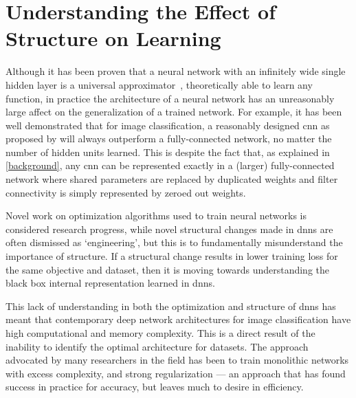 \documentclass[thesis]{subfiles}
\begin{document}
\section[Understanding the Effect of Structure on Learning]{Understanding the Effect of\texorpdfstring{\\}{ }Structure on Learning}
Although it has been proven that a neural network with an infinitely wide single hidden layer is a universal approximator~\citep{journals/mcss/Cybenko92,hornik89a},  theoretically able to learn any function, in practice the architecture of a neural network has an unreasonably large affect on the generalization of a trained network. For example, it has been well demonstrated that for image classification, a reasonably designed \gls{cnn} as proposed by \citet{Lecun1998} will always outperform a fully-connected network, no matter the number of hidden units learned. This is despite the fact that, as explained in \cref{background}, any \gls{cnn} can be represented exactly in a (larger) fully-connected network where shared parameters are replaced by duplicated weights and filter connectivity is simply represented by zeroed out weights.

Novel work on optimization algorithms used to train neural networks is considered research progress, while novel structural changes made in \glspl{dnn} are often dismissed as `engineering', but this is to fundamentally misunderstand the importance of structure. If a structural change results in lower training loss for the same objective and dataset, then it is moving towards understanding the black box internal representation learned in \glspl{dnn}. %

This lack of understanding in both the optimization and structure of \glspl{dnn} has meant that contemporary deep network architectures for image classification have high computational and memory complexity. This is a direct result of the inability to identify the optimal architecture for datasets. The approach advocated by many researchers in the field has been to train monolithic networks with excess complexity, and strong regularization --- an approach that has found success in practice for accuracy, but leaves much to desire in efficiency.
\end{document}
